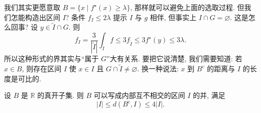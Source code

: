 \begin{remark}\label{rem:2.29}
我们其实更愿意取 $B=\{x \mid f^{\star}(x)\geq\lambda\}$, 那样就可以避免上面的选取过程. 但我们怎能构造出区间 $I$? 条件 $f_I\leq 2\lambda$ 提示 $I$ 与 $g$ 相伴, 但事实上 $I\cap G=\varnothing$. 这是怎么回事? 设 $y\in\tilde{I}\cap G$. 则
\[
f_{I}=\frac{3}{|\tilde{I}|}\int_{I}f\leq 3f_{\tilde{I}}\leq 3f^{\star}(y)\leq 3\lambda.
\]
所以这种形式的界其实与``属于 $G$''大有关系. 要把它说清楚, 我们需要知道: 若 $x\in B$, 则存在区间 $I$ 使 $x\in I$ 且 $G\cap\tilde{I}\neq\varnothing$. 换一种说法: $x$ 到 $B^c$ 的距离与 $I$ 的长度是可比的.
\end{remark}

\begin{theorem}\label{thm:2.30}
设 $B$ 是 $\mathbb{R}$ 的真开子集. 则 $B$ 可以写成内部互不相交的区间 $I$ 的并, 满足
\[
|I|\leq d(B^{c},I)\leq 4|I|.
\]
\end{theorem}

